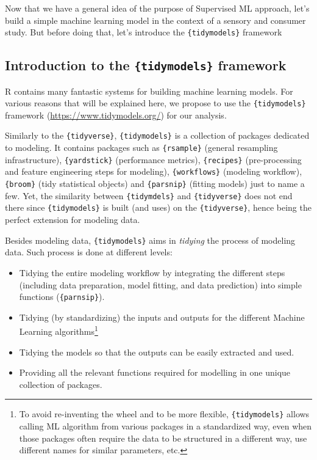 \documentclass[
]{krantz}
\providecommand{\tightlist}{%
  \setlength{\itemsep}{0pt}\setlength{\parskip}{0pt}}
\begin{document}
Now that we have a general idea of the purpose of Supervised ML approach, let's build a simple machine learning model in the context of a sensory and consumer study. But before doing that, let's introduce the \texttt{\{tidymodels\}} framework

\hypertarget{introduction-to-the-tidymodels-framework}{%
\subsection{\texorpdfstring{Introduction to the \texttt{\{tidymodels\}} framework}{Introduction to the \{tidymodels\} framework}}\label{introduction-to-the-tidymodels-framework}}

R contains many fantastic systems for building machine learning models. For various reasons that will be explained here, we propose to use the \texttt{\{tidymodels\}} framework (\url{https://www.tidymodels.org/}) for our analysis.

Similarly to the \texttt{\{tidyverse\}}, \texttt{\{tidymodels\}} is a collection of packages dedicated to modeling. It contains packages such as \texttt{\{rsample\}} (general resampling infrastructure), \texttt{\{yardstick\}} (performance metrics), \texttt{\{recipes\}} (pre-processing and feature engineering steps for modeling), \texttt{\{workflows\}} (modeling workflow), \texttt{\{broom\}} (tidy statistical objects) and \texttt{\{parsnip\}} (fitting models) just to name a few. Yet, the similarity between \texttt{\{tidymdels\}} and \texttt{\{tidyverse\}} does not end there since \texttt{\{tidymodels\}} is built (and uses) on the \texttt{\{tidyverse\}}, hence being the perfect extension for modeling data.

Besides modeling data, \texttt{\{tidymodels\}} aims in \emph{tidying} the process of modeling data. Such process is done at different levels:

\begin{itemize}
\tightlist
\item
  Tidying the entire modeling workflow by integrating the different steps (including data preparation, model fitting, and data prediction) into simple functions (\texttt{\{parnsip\}}).
\item
  Tidying (by standardizing) the inputs and outputs for the different Machine Learning algorithms\footnote{To avoid re-inventing the wheel and to be more flexible, \texttt{\{tidymodels\}} allows calling ML algorithm from various packages in a standardized way, even when those packages often require the data to be structured in a different way, use different names for similar parameters, etc.}
\item
  Tidying the models so that the outputs can be easily extracted and used.
\item
  Providing all the relevant functions required for modelling in one unique collection of packages.
\end{itemize}
\end{document}
